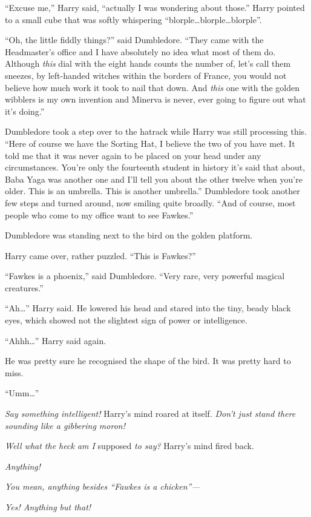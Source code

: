 “Excuse me,” Harry said, “actually I was wondering about those.” Harry pointed to a small cube that was softly whispering “blorple…blorple…blorple”.

“Oh, the little fiddly things?” said Dumbledore. “They came with the Headmaster’s office and I have absolutely no idea what most of them do. Although \emph{this} dial with the eight hands counts the number of, let’s call them sneezes, by left-handed witches within the borders of France, you would not believe how much work it took to nail that down. And \emph{this} one with the golden wibblers is my own invention and Minerva is never, ever going to figure out what it’s doing.”

Dumbledore took a step over to the hatrack while Harry was still processing this. “Here of course we have the Sorting Hat, I believe the two of you have met. It told me that it was never again to be placed on your head under any circumstances. You’re only the fourteenth student in history it’s said that about, Baba Yaga was another one and I’ll tell you about the other twelve when you’re older. This is an umbrella. This is another umbrella.” Dumbledore took another few steps and turned around, now smiling quite broadly. “And of course, most people who come to my office want to see Fawkes.”

Dumbledore was standing next to the bird on the golden platform.

Harry came over, rather puzzled. “This is Fawkes?”

“Fawkes is a phoenix,” said Dumbledore. “Very rare, very powerful magical creatures.”

“Ah…” Harry said. He lowered his head and stared into the tiny, beady black eyes, which showed not the slightest sign of power or intelligence.

“Ahhh…” Harry said again.

He was pretty sure he recognised the shape of the bird. It was pretty hard to miss.

“Umm…”

\emph{Say something intelligent!} Harry’s mind roared at itself. \emph{Don’t just stand there sounding like a gibbering moron!}

\emph{Well what the heck am I} supposed \emph{to say?} Harry’s mind fired back.

\emph{Anything!}

\emph{You mean, anything besides “Fawkes is a chicken”—}

\emph{Yes! Anything but that!}


